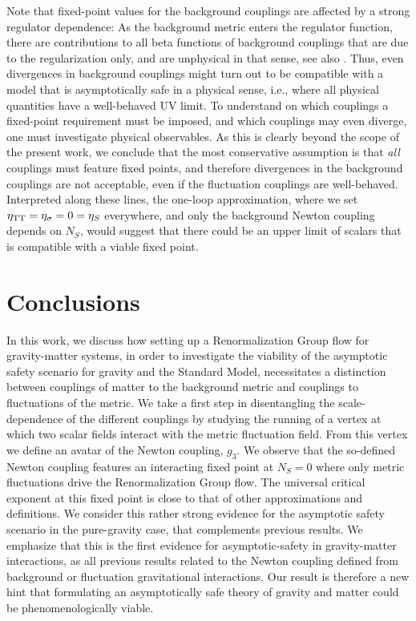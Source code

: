 \documentclass[11pt,draft]{book} %
\begin{document}
Note that fixed-point values for the background couplings are affected by a strong regulator dependence:
As the background metric enters the regulator function,
there are contributions to all beta functions of background couplings that are due to the regularization only,
and are unphysical in that sense, see also \cite{Folkerts:2011jz, Litim:2002ce, Litim:2002hj, Bridle:2013sra}.
Thus, even divergences in background couplings might turn out to be compatible with a model that
is asymptotically safe in a physical sense, i.e., where all physical quantities have a well-behaved UV limit.
To understand on which couplings a fixed-point requirement must be imposed,
and which couplings may even diverge, one must investigate physical observables.
As this is clearly beyond the scope of the present work, we conclude that the most conservative
assumption is that \emph{all} couplings must feature fixed points,
and therefore divergences in the background couplings are not acceptable,
even if the fluctuation couplings are well-behaved. Interpreted along these lines,
the one-loop approximation, where we set $\eta_{\rm TT}=\eta_{\sigma}=0=\eta_S$ everywhere,
and only the background Newton coupling depends on $N_S$,
would suggest that there could be an upper limit of scalars that is compatible with a viable fixed point.
\newline\\

%
\section{Conclusions}
%
In this work, we discuss how setting up a Renormalization Group flow for gravity-matter systems,
in order to investigate the viability of the asymptotic safety scenario for gravity and the Standard Model,
necessitates a distinction between couplings of matter to the background metric and couplings to
fluctuations of the metric.
We take a first step in disentangling the scale-dependence of the different couplings by studying
the running of a vertex at which two scalar fields interact with the metric fluctuation field.
From this vertex we define an avatar of the Newton coupling, $g_3$.
We observe that the so-defined Newton coupling features an interacting fixed point at $N_S=0$
where only metric fluctuations drive the Renormalization Group flow.
The universal critical exponent at this fixed point is close to that of other approximations and definitions.
We consider this rather strong evidence for the asymptotic safety scenario  in the pure-gravity case,
that complements previous results.
We emphasize that this is the first evidence for asymptotic-safety in gravity-matter interactions,
as all previous results related to the Newton coupling defined from background or fluctuation
gravitational interactions.
Our result is therefore a new hint that formulating an asymptotically safe theory of gravity
and matter could be phenomenologically viable.\newline
\end{document}
